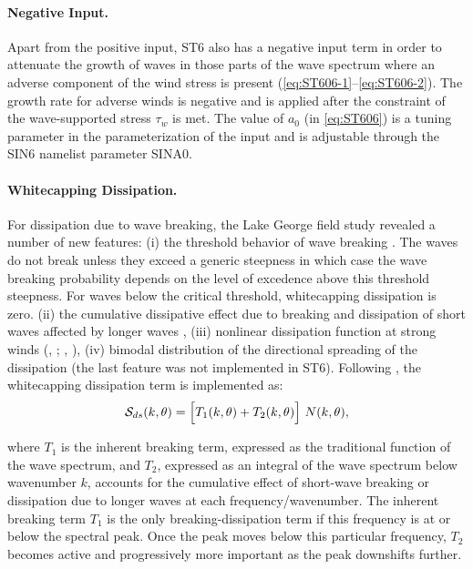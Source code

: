 \paragraph{Negative Input.} Apart from the positive input, {\code ST6} also has a
negative input term in order to attenuate the growth of waves in those parts
of the wave spectrum where an adverse component of the wind stress is present
(\ref{eq:ST606-1}--\ref{eq:ST606-2}). The growth rate for adverse winds
is negative \citep{pro:Don99} and is applied after the constraint of
the wave-supported stress $\tau_w$ is met. The value of $a_0$
(in \ref{eq:ST606}) is a tuning parameter in the parameterization of the
input and is adjustable through the {\F SIN6} namelist parameter {\code  SINA0}.


\noindent
\paragraph{Whitecapping Dissipation.} For dissipation due to wave breaking,
the Lake George field study revealed a number of new features: (i) the
threshold behavior of wave breaking \citep{art:BBY01}. The waves do not
break unless they exceed a generic steepness in which case the wave breaking
probability depends on the level of excedence above this threshold steepness.
For waves below the critical threshold, whitecapping dissipation is zero.
(ii) the cumulative dissipative effect due to breaking and dissipation of
short waves affected by longer waves
\citep{pro:Don01,pro:BY05,art:Mea06,art:YB06,art:Bea10},
(iii) nonlinear dissipation function at strong winds
(\citeauthor{art:Mea06}, \citeyear{art:Mea06};\linebreak
 \citeauthor{art:Bea07}, \citeyear{art:Bea07}),
(iv) bimodal distribution of the directional spreading of the dissipation
\citep{art:YB06,art:Bea10} (the last feature was not implemented in {\code ST6}).
Following \citet{art:RBW12}, the whitecapping dissipation term is
implemented as:
\begin{equation}\label{eq:ST620}
  \cS_{ds}(k,\theta) = \Bigl [ T_1(k,\theta) + T_2(k,\theta) \Bigr ]\ N(k,\theta) ,
\end{equation}

\noindent
where $T_1$ is the inherent breaking term, expressed as the traditional function
of the wave spectrum, and $T_2$, expressed as an integral of the wave spectrum below
wavenumber $k$, accounts for the cumulative effect of short-wave breaking or
dissipation due to longer waves at each frequency/wavenumber. The inherent breaking
term $T_1$ is the only breaking-dissipation term if this frequency is at or below
the spectral peak. Once the peak moves below this particular frequency, $T_2$
becomes active and progressively more important as the peak downshifts further.

